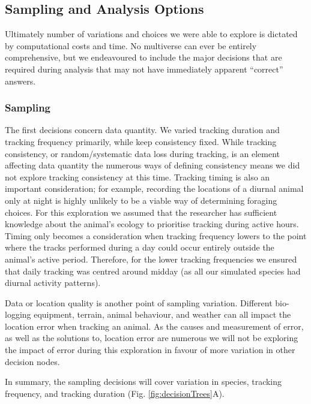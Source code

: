 \documentclass[10pt,a4paper]{article}
\begin{document}
\hypertarget{sampling-and-analysis-options}{%
\subsection{Sampling and Analysis Options}\label{sampling-and-analysis-options}}

Ultimately number of variations and choices we were able to explore is dictated by computational costs and time.
No multiverse can ever be entirely comprehensive, but we endeavoured to include the major decisions that are required during analysis that may not have immediately apparent ``correct'' answers.

\hypertarget{sampling}{%
\subsubsection{Sampling}\label{sampling}}

The first decisions concern data quantity.
We varied tracking duration and tracking frequency primarily, while keep consistency fixed.
While tracking consistency, or random/systematic data loss during tracking, is an element affecting data quantity the numerous ways of defining consistency means we did not explore tracking consistency at this time.
Tracking timing is also an important consideration; for example, recording the locations of a diurnal animal only at night is highly unlikely to be a viable way of determining foraging choices.
For this exploration we assumed that the researcher has sufficient knowledge about the animal's ecology to prioritise tracking during active hours.
Timing only becomes a consideration when tracking frequency lowers to the point where the tracks performed during a day could occur entirely outside the animal's active period.
Therefore, for the lower tracking frequencies we ensured that daily tracking was centred around midday (as all our simulated species had diurnal activity patterns).

Data or location quality is another point of sampling variation.
Different bio-logging equipment, terrain, animal behaviour, and weather can all impact the location error when tracking an animal.
As the causes and measurement of error, as well as the solutions to, location error are numerous we will not be exploring the impact of error during this exploration in favour of more variation in other decision nodes.

In summary, the sampling decisions will cover variation in species, tracking frequency, and tracking duration (Fig. \ref{fig:decisionTrees}A).
\end{document}
